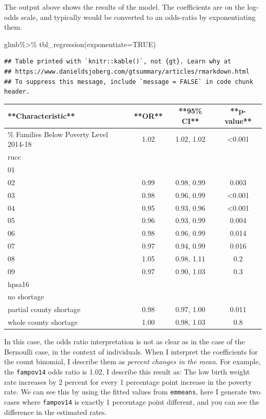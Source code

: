 \documentclass[
]{article}
\newenvironment{Shaded}{\begin{snugshade}}{\end{snugshade}}
\newcommand{\AttributeTok}[1]{\textcolor[rgb]{0.77,0.63,0.00}{#1}}
\newcommand{\ConstantTok}[1]{\textcolor[rgb]{0.00,0.00,0.00}{#1}}
\newcommand{\FunctionTok}[1]{\textcolor[rgb]{0.00,0.00,0.00}{#1}}
\newcommand{\NormalTok}[1]{#1}
\newcommand{\SpecialCharTok}[1]{\textcolor[rgb]{0.00,0.00,0.00}{#1}}
\begin{document}
The output above shows the results of the model. The coefficients are on the log-odds scale, and typically would be converted to an odds-ratio by exponentiating them.

\begin{Shaded}
\begin{Highlighting}[]
\NormalTok{glmb}\SpecialCharTok{\%\textgreater{}\%}
  \FunctionTok{tbl\_regression}\NormalTok{(}\AttributeTok{exponentiate=}\ConstantTok{TRUE}\NormalTok{)}
\end{Highlighting}
\end{Shaded}

\begin{verbatim}
## Table printed with `knitr::kable()`, not {gt}. Learn why at
## https://www.danieldsjoberg.com/gtsummary/articles/rmarkdown.html
## To suppress this message, include `message = FALSE` in code chunk header.
\end{verbatim}

\begin{tabular}{l|c|c|c}
\hline
**Characteristic** & **OR** & **95\% CI** & **p-value**\\
\hline
\% Families Below Poverty Level 2014-18 & 1.02 & 1.02, 1.02 & <0.001\\
\hline
rucc &  &  & \\
\hline
01 &  &  & \\
\hline
02 & 0.99 & 0.98, 0.99 & 0.003\\
\hline
03 & 0.98 & 0.96, 0.99 & <0.001\\
\hline
04 & 0.95 & 0.93, 0.96 & <0.001\\
\hline
05 & 0.96 & 0.93, 0.99 & 0.004\\
\hline
06 & 0.98 & 0.96, 0.99 & 0.014\\
\hline
07 & 0.97 & 0.94, 0.99 & 0.016\\
\hline
08 & 1.05 & 0.98, 1.11 & 0.2\\
\hline
09 & 0.97 & 0.90, 1.03 & 0.3\\
\hline
hpsa16 &  &  & \\
\hline
no shortage &  &  & \\
\hline
partial county shortage & 0.98 & 0.97, 1.00 & 0.011\\
\hline
whole county shortage & 1.00 & 0.98, 1.03 & 0.8\\
\hline
\end{tabular}

In this case, the odds ratio interpretation is not as clear as in the case of the Bernoulli case, in the context of individuals. When I interpret the coefficients for the count binomial, I describe them as \emph{percent changes in the mean}. For example, the \texttt{fampov14} odds ratio is 1.02, I describe this result as: The low birth weight rate increases by 2 percent for every 1 percentage point increase in the poverty rate. We can see this by using the fitted values from \texttt{emmeans}, here I generate two cases where \texttt{fampov14} is exactly 1 percentage point different, and you can see the difference in the estimated rates.
\end{document}
